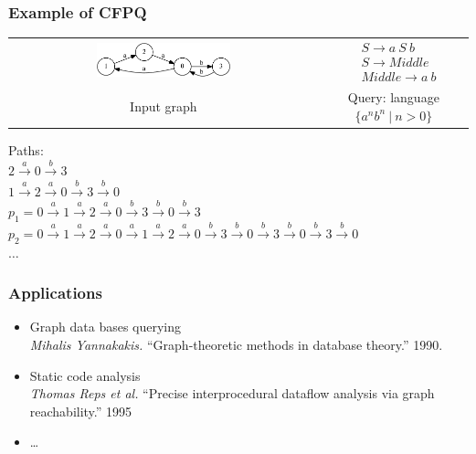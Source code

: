 \documentclass[xcolor=table]{beamer}
\begin{document}
\begin{frame} \frametitle{Example of CFPQ}

\begin{center}
  \begin{tabular}{  c  c  }
      \includegraphics[width=0.45\textwidth]{pictures/input.pdf}
      &
  $

  \begin{array}{rl}
     & S \rightarrow a \ S \ b \\
     & S \rightarrow Middle \\
     & Middle \rightarrow a \ b
  \end{array}

  $
  \\
  Input graph
  &
  Query: language $\{a^nb^n \ | \ n > 0 \}$

  \end{tabular}
\end{center}
\vspace{0.5cm}
Paths: \\
$2 \xrightarrow{a} 0 \xrightarrow{b} 3$ \\
$1 \xrightarrow{a} 2 \xrightarrow{a} 0 \xrightarrow{b} 3 \xrightarrow{b} 0$ \\
$p_1 = 0 \xrightarrow{a} 1 \xrightarrow{a} 2 \xrightarrow{a} 0 \xrightarrow{b} 3 \xrightarrow{b} 0 \xrightarrow{b} 3$ \\
$p_2 = 0 \xrightarrow{a} 1 \xrightarrow{a} 2 \xrightarrow{a} 0 \xrightarrow{a} 1 \xrightarrow{a} 2 \xrightarrow{a} 0 \xrightarrow{b} 3 \xrightarrow{b} 0 \xrightarrow{b} 3 \xrightarrow{b} 0 \xrightarrow{b} 3 \xrightarrow{b} 0$ \\
$\dots$

\end{frame}


\begin{frame} \frametitle{Applications}
\begin{itemize}
\item Graph data bases querying \\
\emph{Mihalis Yannakakis.} ``Graph-theoretic methods in database theory.'' 1990.
\item Static code analysis \\
\emph{Thomas Reps et al.} ``Precise interprocedural dataflow analysis via graph reachability.'' 1995
\item \dots
\end{itemize}
\end{frame}
\end{document}
